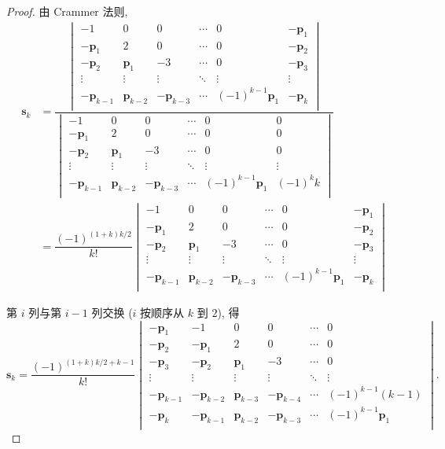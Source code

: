 \documentclass[color=black,device=normal,lang=cn,mode=geye]{elegantnote}
\begin{document}
\begin{proof}
    由 Crammer 法则,
    \begin{align*}
        \mathbf{s}_k & =\dfrac{\begin{vmatrix}
            -1 & 0 & 0 & \cdots & 0 & -\mathbf{p}_1 \\
            -\mathbf{p}_1 & 2 & 0 & \cdots & 0 & -\mathbf{p}_2 \\
            -\mathbf{p}_2 & \mathbf{p}_1 & -3 & \cdots & 0 & -\mathbf{p}_3 \\
            \vdots & \vdots & \vdots & \ddots & \vdots & \vdots \\
            -\mathbf{p}_{k-1} & \mathbf{p}_{k-2} & -\mathbf{p}_{k-3} & \cdots & (-1)^{k-1}\mathbf{p}_1 & -\mathbf{p}_k \\
        \end{vmatrix}}{\begin{vmatrix}
            -1 & 0 & 0 & \cdots & 0 & 0 \\
            -\mathbf{p}_1 & 2 & 0 & \cdots & 0 & 0 \\
            -\mathbf{p}_2 & \mathbf{p}_1 & -3 & \cdots & 0 & 0 \\
            \vdots & \vdots & \vdots & \ddots & \vdots & \vdots \\
            -\mathbf{p}_{k-1} & \mathbf{p}_{k-2} & -\mathbf{p}_{k-3} & \cdots & (-1)^{k-1}\mathbf{p}_1 & (-1)^kk \\
        \end{vmatrix}} \\
        & =\dfrac{(-1)^{(1+k)k/2}}{k!}\begin{vmatrix}
            -1 & 0 & 0 & \cdots & 0 & -\mathbf{p}_1 \\
            -\mathbf{p}_1 & 2 & 0 & \cdots & 0 & -\mathbf{p}_2 \\
            -\mathbf{p}_2 & \mathbf{p}_1 & -3 & \cdots & 0 & -\mathbf{p}_3 \\
            \vdots & \vdots & \vdots & \ddots & \vdots & \vdots \\
            -\mathbf{p}_{k-1} & \mathbf{p}_{k-2} & -\mathbf{p}_{k-3} & \cdots & (-1)^{k-1}\mathbf{p}_1 & -\mathbf{p}_k \\
        \end{vmatrix}
    \end{align*}

    第 $i$ 列与第 $i-1$ 列交换 ($i$ 按顺序从 $k$ 到 $2$), 得
    \[\mathbf{s}_k=\dfrac{(-1)^{(1+k)k/2+k-1}}{k!}\begin{vmatrix}
        -\mathbf{p}_1 & -1 & 0 & 0 & \cdots & 0 \\
        -\mathbf{p}_2 & -\mathbf{p}_1 & 2 & 0 & \cdots & 0 \\
        -\mathbf{p}_3 & -\mathbf{p}_2 & \mathbf{p}_1 & -3 & \cdots & 0 \\
        \vdots & \vdots & \vdots & \vdots & \ddots & \vdots \\
        -\mathbf{p}_{k-1} & -\mathbf{p}_{k-2} & \mathbf{p}_{k-3} & -\mathbf{p}_{k-4} & \cdots & (-1)^{k-1}(k-1) \\
        -\mathbf{p}_k & -\mathbf{p}_{k-1} & \mathbf{p}_{k-2} & -\mathbf{p}_{k-3} & \cdots & (-1)^{k-1}\mathbf{p}_1 \\
    \end{vmatrix}.\]


\end{proof}
\end{document}
